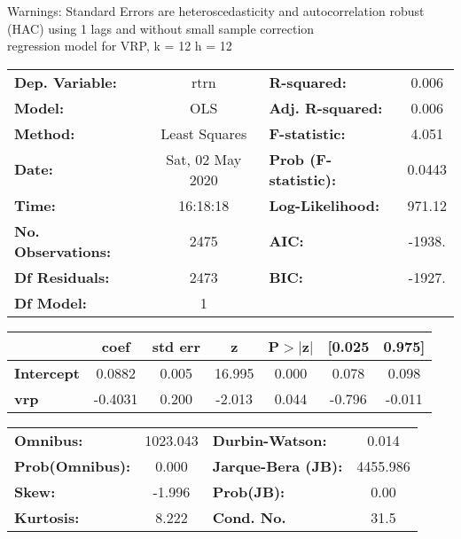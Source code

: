 Warnings: \newline
 [1] Standard Errors are heteroscedasticity and autocorrelation robust (HAC) using 1 lags and without small sample correction\\ 

regression model for VRP, k = 12 h = 12\begin{center}
\begin{tabular}{lclc}
\toprule
\textbf{Dep. Variable:}    &       rtrn       & \textbf{  R-squared:         } &     0.006   \\
\textbf{Model:}            &       OLS        & \textbf{  Adj. R-squared:    } &     0.006   \\
\textbf{Method:}           &  Least Squares   & \textbf{  F-statistic:       } &     4.051   \\
\textbf{Date:}             & Sat, 02 May 2020 & \textbf{  Prob (F-statistic):} &   0.0443    \\
\textbf{Time:}             &     16:18:18     & \textbf{  Log-Likelihood:    } &    971.12   \\
\textbf{No. Observations:} &        2475      & \textbf{  AIC:               } &    -1938.   \\
\textbf{Df Residuals:}     &        2473      & \textbf{  BIC:               } &    -1927.   \\
\textbf{Df Model:}         &           1      & \textbf{                     } &             \\
\bottomrule
\end{tabular}
\begin{tabular}{lcccccc}
                   & \textbf{coef} & \textbf{std err} & \textbf{z} & \textbf{P$> |$z$|$} & \textbf{[0.025} & \textbf{0.975]}  \\
\midrule
\textbf{Intercept} &       0.0882  &        0.005     &    16.995  &         0.000        &        0.078    &        0.098     \\
\textbf{vrp}       &      -0.4031  &        0.200     &    -2.013  &         0.044        &       -0.796    &       -0.011     \\
\bottomrule
\end{tabular}
\begin{tabular}{lclc}
\textbf{Omnibus:}       & 1023.043 & \textbf{  Durbin-Watson:     } &    0.014  \\
\textbf{Prob(Omnibus):} &   0.000  & \textbf{  Jarque-Bera (JB):  } & 4455.986  \\
\textbf{Skew:}          &  -1.996  & \textbf{  Prob(JB):          } &     0.00  \\
\textbf{Kurtosis:}      &   8.222  & \textbf{  Cond. No.          } &     31.5  \\
\bottomrule
\end{tabular}
\end{center}

